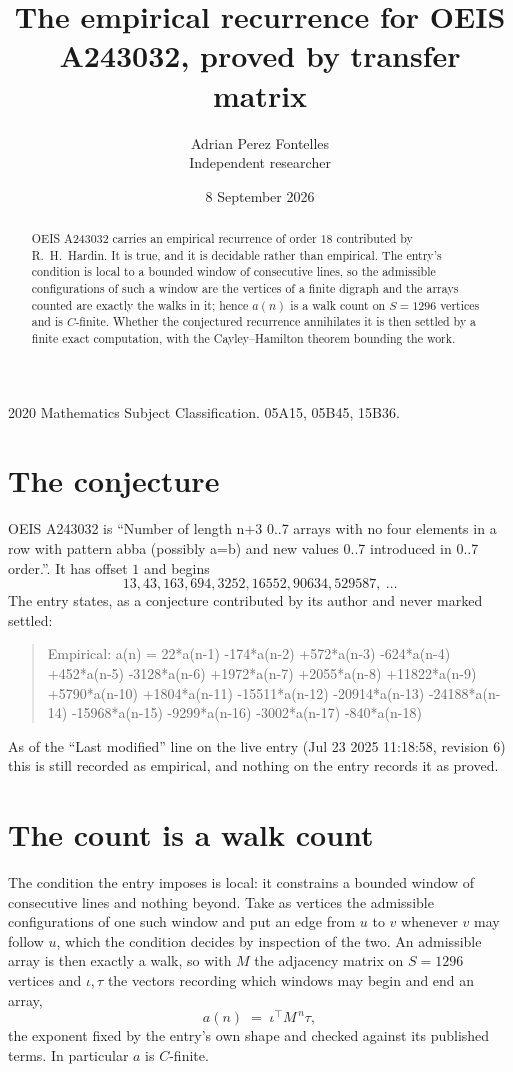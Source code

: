 \documentclass[11pt,a4paper]{article}
\title{The empirical recurrence for OEIS A243032, proved by transfer matrix}
\author{Adrian Perez Fontelles\\ \small Independent researcher}
\date{8 September 2026}
\theoremstyle{plain}
\theoremstyle{definition}
\begin{document}
\maketitle

\begin{abstract}
OEIS A243032 carries an empirical recurrence of order $18$ contributed by R.~H.~Hardin. It is
true, and it is decidable rather than empirical. The entry's condition is local to a bounded window of consecutive lines, so
the admissible configurations of such a window are the vertices of a finite digraph and the
arrays counted are exactly the walks in it; hence $a(n)$ is a walk count on $S=1296$ vertices
and is $C$-finite. Whether the conjectured recurrence annihilates it is then settled by a
finite exact computation, with the Cayley--Hamilton theorem bounding the work.
\end{abstract}

\noindent\small 2020 Mathematics Subject Classification. 05A15, 05B45, 15B36.\normalsize

\section{The conjecture}

OEIS A243032 is ``Number of length n+3 0..7 arrays with no four elements in a row with pattern abba (possibly a=b) and new values 0..7 introduced in 0..7 order.''. It has offset $1$ and begins
\[
13, 43, 163, 694, 3252, 16552, 90634, 529587,\ \dots
\]
The entry states, as a conjecture contributed by its author and never marked settled:
\begin{quote}
Empirical: a(n) = 22*a(n-1) -174*a(n-2) +572*a(n-3) -624*a(n-4) +452*a(n-5) -3128*a(n-6) +1972*a(n-7) +2055*a(n-8) +11822*a(n-9) +5790*a(n-10) +1804*a(n-11) -15511*a(n-12) -20914*a(n-13) -24188*a(n-14) -15968*a(n-15) -9299*a(n-16) -3002*a(n-17) -840*a(n-18)
\end{quote}
As of the ``Last modified'' line on the live entry (Jul 23 2025 11:18:58, revision 6) this is still
recorded as empirical, and nothing on the entry records it as proved.

\section{The count is a walk count}

The condition the entry imposes is local: it constrains a bounded window of consecutive lines and nothing beyond. Take as
vertices the admissible configurations of one such window and put an edge from $u$ to $v$
whenever $v$ may follow $u$, which the condition decides by inspection of the two. An
admissible array is then exactly a walk, so with $M$ the adjacency matrix on $S=1296$ vertices
and $\iota,\tau$ the vectors recording which windows may begin and end an array,
\[
a(n)\;=\;\iota^{\!\top}M^{\,n}\tau ,
\]
the exponent fixed by the entry's own shape and checked against its published terms. In
particular $a$ is $C$-finite.
\end{document}
